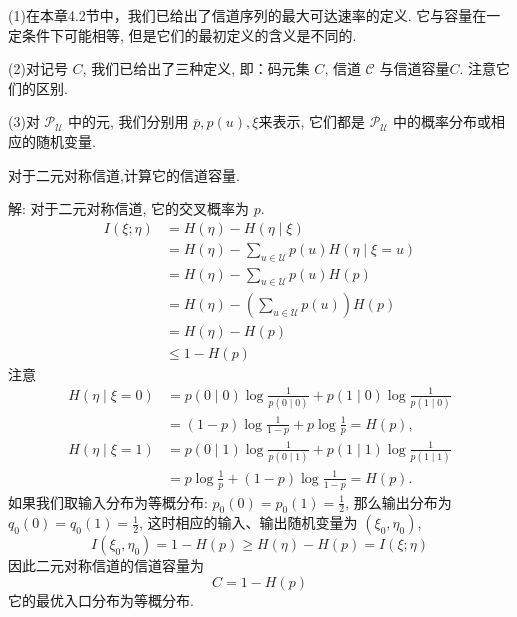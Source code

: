 \begin{remark}

    (1)在本章4.2节中，我们已给出了信道序列的最大可达速率的定义. 它与容量在一定条件下可能相等, 但是它们的最初定义的含义是不同的.
    
(2)对记号 $ C $, 我们已给出了三种定义, 即：码元集 $ C $, 信道 $ \mathscr{C} $ 与信道容量$C$. 注意它们的区别.

(3)对 $ \mathscr{P}_{\mathscr{U}} $ 中的元, 我们分别用 $ \overline{p}, p(u), \xi $来表示, 它们都是 $ \mathscr{P}_{\mathscr{U}} $ 中的概率分布或相应的随机变量.
\end{remark}
\begin{example}
 对于二元对称信道,计算它的信道容量.
 
 解: 对于二元对称信道, 它的交叉概率为 $ p $.
$$
\begin{aligned}
I(\xi ; \eta) & =H(\eta)-H(\eta \mid \xi) \\
& =H(\eta)-\sum_{u \in \mathscr{U}} p(u) H(\eta \mid \xi=u) \\
& =H(\eta)-\sum_{u \in \mathscr{U}} p(u) H(p) \\
& =H(\eta)-\left(\sum_{u \in \mathscr{U}} p(u)\right) H(p) \\
& =H(\eta)-H(p) \\
& \leq 1-H(p)
\end{aligned}
$$
注意
$$
\begin{aligned}
H(\eta \mid \xi=0)&=p(0 \mid 0) \log \frac{1}{p(0 \mid 0)}+p(1 \mid 0) \log \frac{1}{p(1 \mid 0)} \\
&=(1-p) \log \frac{1}{1-p}+p \log \frac{1}{p}=H(p), \\
H(\eta \mid \xi=1)&=p(0 \mid 1) \log \frac{1}{p(0 \mid 1)}+p(1 \mid 1) \log \frac{1}{p(1 \mid 1)} \\
&=p \log \frac{1}{p}+(1-p) \log \frac{1}{1-p}=H(p) .
\end{aligned}
$$
如果我们取输入分布为等概分布: $ p_{0}(0)=p_{0}(1)=\frac{1}{2} $, 那么输出分布为 $ q_{0}(0)=q_{0}(1)=\frac{1}{2} $, 这时相应的输入、输出随机变量为 $ \left(\xi_{0}, \eta_{0}\right) $,
$$
I\left(\xi_{0}, \eta_{0}\right)=1-H(p) \geq H(\eta)-H(p)=I(\xi ; \eta)
$$
因此二元对称信道的信道容量为
$$
C=1-H(p)
$$
它的最优入口分布为等概分布.
\end{example}

